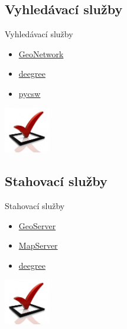 \documentclass[xcolor=dvipsnames]{beamer}
\begin{document}
\subsection{Vyhledávací služby}
\begin{frame}{Vyhledávací služby}
    \begin{itemize}
        \item \href{http://geonetwork-opensource.org}{GeoNetwork}
        \item \href{http://deegree.org}{deegree}
        \item \href{http://pycsw.org}{pycsw}
    \end{itemize}
    \begin{flushright} \includegraphics[width=2cm]{imgs/ils/done.jpg} \end{flushright}
\end{frame}

\subsection{Stahovací služby}
\begin{frame}{Stahovací služby}
    \begin{itemize}
        \item \href{http://geoserver.org}{GeoServer}
        \item \href{http://mapserver.org}{MapServer}
        \item \href{http://deegree.org}{deegree}
    \end{itemize}
    \begin{flushright}\includegraphics[width=2cm]{imgs/ils/done.jpg}\end{flushright}
\end{frame}
\end{document}
